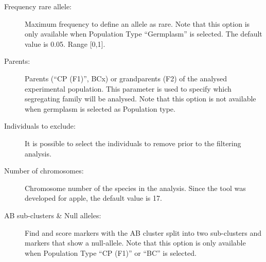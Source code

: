 \documentclass[a4paper,11pt,english]{article}
\begin{document}
\begin{description}
\item [Frequency rare allele:] Maximum frequency to define an allele as rare. Note that this option
is only available when Population Type ``Germplasm'' is selected. The default value is 0.05. Range
{[}0,1{]}.

\item [Parents:] Parents (``CP (F1)'', BCx) or grandparents (F2) of the analysed
experimental population.
This parameter is used to specify which segregating family will be analysed.
Note that this option is not available when germplasm is selected as Population type.

\item [Individuals to exclude:] It is possible to select the individuals to remove prior
to the
filtering analysis.

\item [Number of chromosomes:] Chromosome number of the species in the analysis. Since the
tool was developed for apple, the default value is 17.

\item [AB sub-clusters \& Null alleles:] Find and score markers with the AB cluster
split into two sub-clusters and
markers that show a null-allele.
Note that this option is only available when Population Type ``CP (F1)'' or ``BC'' is selected.
\end{description}
\end{document}
